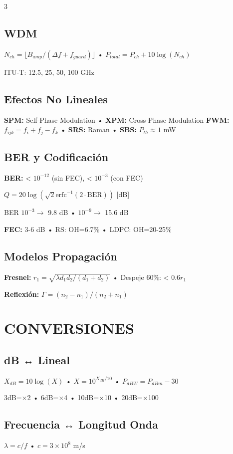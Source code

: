 \documentclass[a4paper,6pt]{extarticle}
\begin{document}
\begin{multicols}{3}
    \subsection*{WDM}
    $\boxed{N_{ch} = \lfloor B_{amp}/(\Delta f + f_{guard})\rfloor}$ • $P_{total} = P_{ch} + 10\log(N_{ch})$
    
    ITU-T: 12.5, 25, 50, 100 GHz

    \subsection*{Efectos No Lineales}
    \textbf{SPM:} Self-Phase Modulation • \textbf{XPM:} Cross-Phase Modulation
    \textbf{FWM:} $f_{ijk} = f_i + f_j - f_k$ • \textbf{SRS:} Raman • \textbf{SBS:} $P_{th} \approx 1$ mW

    \subsection*{BER y Codificación}
    \textbf{BER:} < $10^{-12}$ (sin FEC), < $10^{-3}$ (con FEC)
    
    $\boxed{Q = 20\log(\sqrt{2}\text{erfc}^{-1}(2\cdot\text{BER}))}$ [dB]
    
    BER $10^{-3} \rightarrow$ 9.8 dB • $10^{-9} \rightarrow$ 15.6 dB
    
    \textbf{FEC:} 3-6 dB • RS: OH=6.7\% • LDPC: OH=20-25\%

    \subsection*{Modelos Propagación}
    \textbf{Fresnel:} $r_1 = \sqrt{\lambda d_1 d_2/(d_1+d_2)}$ • Despeje 60\%: < 0.6$r_1$
    
    \textbf{Reflexión:} $\Gamma = (n_2-n_1)/(n_2+n_1)$

    \section*{CONVERSIONES}

    \subsection*{dB ↔ Lineal}
    $\boxed{X_{dB} = 10\log(X)}$ • $X = 10^{X_{dB}/10}$ • $P_{dBW} = P_{dBm} - 30$
    
    3dB=$\times$2 • 6dB=$\times$4 • 10dB=$\times$10 • 20dB=$\times$100

    \subsection*{Frecuencia ↔ Longitud Onda}
    $\boxed{\lambda = c/f}$ • $c = 3\times10^8$ m/s
    

\end{multicols}
\end{document}
